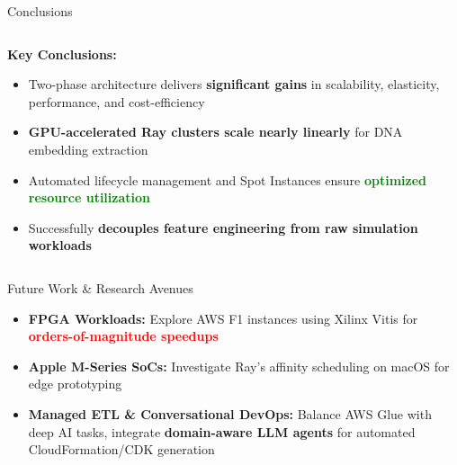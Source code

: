 \documentclass[aspectratio=169]{beamer}
\begin{document}
\begin{frame}{Conclusions}
    \begin{columns}
        \begin{column}{0.6\textwidth}
            \textbf{Key Conclusions:}
            \begin{itemize}
                \item Two-phase architecture delivers \textbf{significant gains} in scalability, elasticity, performance, and cost-efficiency
                \item \textcolor{rayblue}{\textbf{GPU-accelerated Ray clusters scale nearly linearly}} for DNA embedding extraction
                \item Automated lifecycle management and Spot Instances ensure \textcolor{green}{\textbf{optimized resource utilization}}
                \item Successfully \textbf{decouples feature engineering from raw simulation workloads}
            \end{itemize}
        \end{column}
        \begin{column}{0.4\textwidth}
        \end{column}
    \end{columns}
    
    \vspace{0.3cm}
    \begin{block}{Future Work \& Research Avenues}
        \begin{itemize}
            \item \textbf{FPGA Workloads:} Explore AWS F1 instances using Xilinx Vitis for \textcolor{red}{\textbf{orders-of-magnitude speedups}}
            \item \textbf{Apple M-Series SoCs:} Investigate Ray's affinity scheduling on macOS for edge prototyping
            \item \textbf{Managed ETL \& Conversational DevOps:} Balance AWS Glue with deep AI tasks, integrate \textcolor{rayblue}{\textbf{domain-aware LLM agents}} for automated CloudFormation/CDK generation
        \end{itemize}
    \end{block}
\end{frame}
\end{document}
